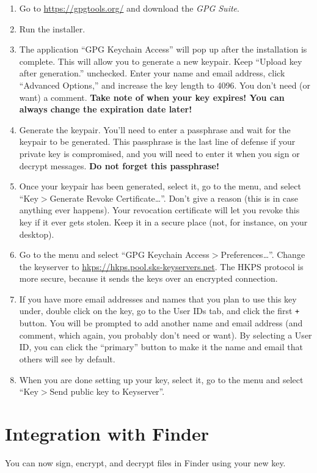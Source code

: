 \documentclass{article}
\begin{document}
\begin{enumerate}
\item Go to \url{https://gpgtools.org/} and download the \textit{GPG
    Suite}.
\item Run the installer.
\item The application ``GPG Keychain Access'' will pop up after the
  installation is complete.  This will allow you to generate a new
  keypair.  Keep ``Upload key after generation.'' unchecked.  Enter
  your name and email address, click ``Advanced Options,'' and
  increase the key length to 4096.  You don't need (or want) a
  comment.  \textbf{Take note of when your key expires!  You can
    always change the expiration date later!}
\item Generate the keypair.  You'll need to enter a passphrase and
  wait for the keypair to be generated.  This passphrase is the last
  line of defense if your private key is compromised, and you will
  need to enter it when you sign or decrypt messages.  \textbf{Do not
    forget this passphrase!}
\item Once your keypair has been generated, select it, go to the menu,
  and select ``Key$>$Generate Revoke Certificate\dots''.  Don't give a
  reason (this is in case anything ever happens).  Your revocation
  certificate will let you revoke this key if it ever gets stolen.
  Keep it in a secure place (not, for instance, on your desktop).
\item Go to the menu and select ``GPG Keychain
  Access$>$Preferences\dots''.  Change the keyserver to
  \url{hkps://hkps.pool.sks-keyservers.net}.  The HKPS protocol is
  more secure, because it sends the keys over an encrypted
  connection.
\item If you have more email addresses and names that you plan to use
  this key under, double click on the key, go to the User IDs tab, and
  click the first \texttt{+} button.  You will be prompted to add
  another name and email address (and comment, which again, you
  probably don't need or want).  By selecting a User ID, you can click
  the ``primary'' button to make it the name and email that others
  will see by default.
\item When you are done setting up your key, select it, go to the
  menu and select ``Key$>$Send public key to Keyserver''.
\end{enumerate}

\section*{Integration with Finder}
You can now sign, encrypt, and decrypt files in Finder using your new
key.
\end{document}
